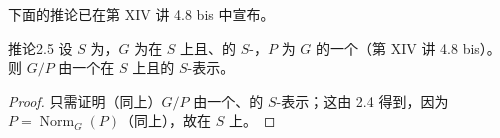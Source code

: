 下面的推论已在第 XIV 讲 4.8 bis 中宣布。
\begin{SGAresult}{推论}{2.5}
设 $S$ 为，$G$ 为在 $S$ 上且、的 $S$-，$P$ 为 $G$ 的一个（第 XIV 讲 4.8 bis）。则 $G/P$ 由一个在 $S$ 上且的 $S$-表示。
\end{SGAresult}
\begin{proof}
只需证明（同上）$G/P$ 由一个、的 $S$-表示；这由 2.4 得到，因为 $P=\operatorname{Norm}_G(P)$（同上），故在 $S$ 上。
\end{proof}

